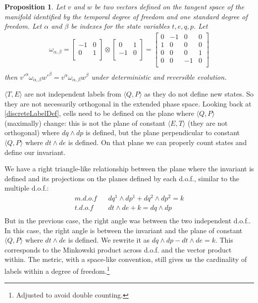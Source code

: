 \documentclass[twocolumn,floatfix,nofootinbib]{revtex4}   %
\theoremstyle{theorem}
\newtheorem{prop}[thm]{Proposition}
\theoremstyle{definition}
\begin{document}
\begin{prop}\label{tdofInvariant}
Let $v$ and $w$ be two vectors defined on the tangent space of the manifold identified by the temporal degree of freedom and one standard degree of freedom. Let $\alpha$ and $\beta$ be indexes for the state variables $t, e, q, p$. Let
\begin{align*}
\omega_{\alpha, \beta} =  \left[
  \begin{array}{cc}
    -1 & 0 \\
    0 & 1 \\
  \end{array}
\right] \otimes \left[
  \begin{array}{cc}
    0 & 1 \\
    -1 & 0 \\
  \end{array}
\right]
= \left[
  \begin{array}{cccc}
    0 & -1 & 0 & 0 \\
    1 & 0 & 0 & 0 \\
    0 & 0 & 0 & 1 \\
    0 & 0 & -1 & 0 \\
  \end{array}
\right] \\
\end{align*}
then $v'^{\alpha} \omega_{\alpha, \beta} w'^{\beta}=v^{\alpha} \omega_{\alpha, \beta} w^{\beta}$ under deterministic and reversible evolution.
\end{prop}

$\langle T, E \rangle$ are not independent labels from $\langle Q, P \rangle$ as they do not define new states. So they are not necessarily orthogonal in the extended phase space. Looking back at \ref{discreteLabelDef}, cells need to be defined on the plane where $\langle Q, P \rangle$ (maximally) change: this is not the plane of constant $\langle E, T \rangle$ (they are not orthogonal) where $dq \wedge dp$ is defined, but the plane perpendicular to constant $\langle Q, P \rangle$ where $dt \wedge de$ is defined. On that plane we can properly count states and define our invariant.

We have a right triangle-like relationship between the plane where the invariant is defined and its projections on the planes defined by each d.o.f., similar to the multiple d.o.f.:
\begin{align*}
m.d.o.f \;\;\; &dq^1 \wedge dp^1 + dq^2 \wedge dp^2 = k \\
t.d.o.f \;\;\; &dt \wedge de + k = dq \wedge dp \\
\end{align*}
But in the previous case, the right angle was between the two independent d.o.f.. In this case, the right angle is between the invariant and the plane of constant $\langle Q, P \rangle$ where $dt \wedge de$ is defined. We rewrite it as $dq \wedge dp - dt \wedge de = k$. This corresponds to the Minkowski product across d.o.f. and the vector product within. The metric, with a space-like convention, still gives us the cardinality of labels within a degree of freedom.\footnote{Adjusted to avoid double counting.}
\end{document}
